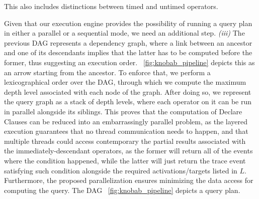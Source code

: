 This also includes distinctions between timed and untimed operators.

Given that our execution engine provides the possibility of running a query plan in either a parallel or a sequential mode, we need   an additional step. \textit{(iii)} The previous DAG  represents a dependency graph, where a link between an ancestor and one of its descendants implies that the latter has to be computed before the former, thus suggesting an execution order. \figurename~\ref{fig:knobab_pipeline} depicts this as an arrow starting from the ancestor. To enforce that, we perform a lexicographical order over the DAG, through which we compute the maximum depth level associated with each node of the graph. After doing so, we represent the query graph as a stack of depth levels, where each operator on it can be run in parallel alongside its siblings.
 This proves that the computation of Declare Clauses can be reduced into an embarrassingly parallel problem, as the layered execution guarantees that no thread communication needs to happen, and that multiple threads could access contemporary the partial results associated with the immediately-descendant operators, as the former will return all of the events where the condition happened, while the latter will just return the trace event satisfying such condition alongside the required activations/targets listed in $L$. Furthermore, the proposed parallelization ensures minimizing the data access for computing the query. The DAG \figurename~\ref{fig:knobab_pipeline} depicts a query plan.
